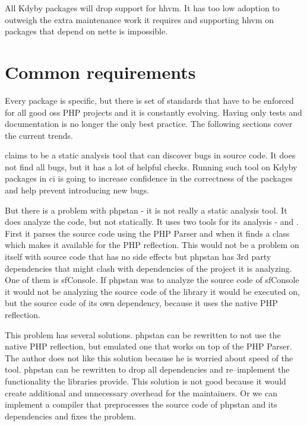 All Kdyby packages will drop support for \gls{hhvm}. It has too low adoption to outweigh the extra maintenance work it requires and supporting \gls{hhvm} on packages that depend on \gls{nette} is impossible.

\section{Common requirements} \label{sec:roadmap:common}

Every package is specific, but there is set of standards that have to be enforced for all good \gls{oss} PHP projects and it is constantly evolving. Having only tests and documentation is no longer the only best practice. The following sections cover the current trends.


 claims to be a static analysis tool that can discover bugs in source code. It does not find all bugs, but it has a lot of helpful checks. Running such tool on Kdyby packages in \gls{ci} is going to increase confidence in the correctness of the packages and help prevent introducing new bugs.

But there is a problem with \gls{phpstan} - it is not really a static analysis tool. It does analyze the code, but not statically. It uses two tools for its analysis -  and . First it parses the source code using the PHP Parser and when it finds a class  which makes it available for the PHP reflection. This would not be a problem on itself with source code that has no side effects but \gls{phpstan} has 3rd party dependencies that might clash with dependencies of the project it is analyzing. One of them is \gls{sfConsole}. If \gls{phpstan} was to analyze the source code of \gls{sfConsole} it would not be analyzing the source code of the library it would be executed on, but the source code of its own dependency, because it uses the native PHP reflection.

This problem has several solutions. \gls{phpstan} can be rewritten to not use the native PHP reflection, but emulated one that works on top of the PHP Parser. The author does not like this solution because he is worried about speed of the tool. \gls{phpstan} can be rewritten to drop all dependencies and re--implement the functionality the libraries provide. This solution is not good because it would create additional and unnecessary overhead for the maintainers. Or we can implement a compiler that preprocesses the source code of \gls{phpstan} and its dependencies and fixes the problem.

